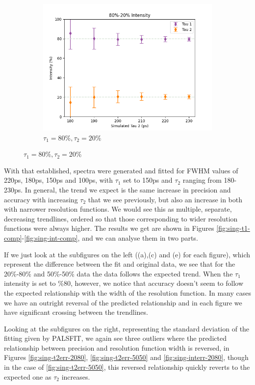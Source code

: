 \begin{figure}[p]
\begin{subfigure}{0.7\textwidth}
        \includegraphics[width=.95\textwidth]{Batch 3/single Gaussian IRF/gauss210/150/output/8020.png}
        \caption{$\tau_1 = 80\%, \tau_2 = 20\%$}
        \label{fig:sing-210-8020}
    \end{subfigure}
    \label{fig:sing-210}
\end{figure}

With that established, spectra were generated and fitted for FWHM values of 220ps, 180ps, 150ps and 100ps, with $\tau_1$ set to 150ps and $\tau_2$ ranging from 180-230ps. In general, the trend we expect is the same increase in precision and accuracy with increasing $\tau_2$ that we see previously, but also an increase in both with narrower resolution functions. We would see this as multiple, separate, decreasing trendlines, ordered so that those corresponding to wider resolution functions were always higher. The results we get are shown in Figures \ref{fig:sing-t1-comp}-\ref{fig:sing-int-comp}, and we can analyse them in two parts.

If we just look at the subfigures on the left ((a),(c) and (e) for each figure), which represent the difference between the fit and original data, we see that for the 20\%-80\% and 50\%-50\% data the data follows the expected trend. When the $\tau_1$ intensity is set to \%80, however, we notice that accuracy doesn't seem to follow the expected relationship with the width of the resolution function. In many cases we have an outright reversal of the predicted relationship and in each figure we have significant crossing between the trendlines.

Looking at the subfigures on the right, representing the standard deviation of the fitting given by PALSFIT, we again see three outliers where the predicted relationship between precision and resolution function width is reversed, in Figures \ref{fig:sing-t2err-2080}, \ref{fig:sing-t2err-5050} and \ref{fig:sing-interr-2080}, though in the case of \ref{fig:sing-t2err-5050}, this reversed relationship quickly reverts to the expected one as $\tau_2$ increases.

